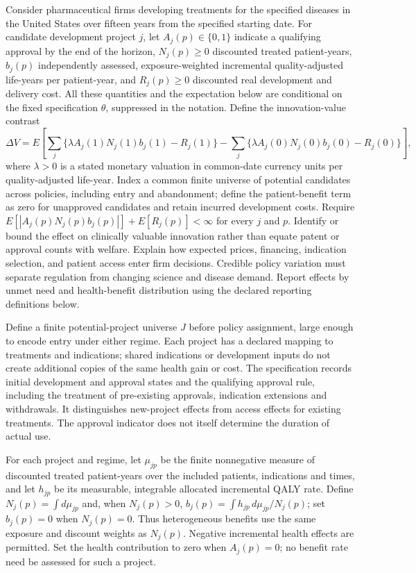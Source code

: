 \documentclass[11pt,a4paper]{article}
\begin{document}
Consider pharmaceutical firms developing treatments for the specified diseases in the United States over fifteen years from the specified starting date. For candidate development project \(j\), let \(A_j(p)\in\{0,1\}\) indicate a qualifying approval by the end of the horizon, \(N_j(p)\geq0\) discounted treated patient-years, \(b_j(p)\) independently assessed, exposure-weighted incremental quality-adjusted life-years per patient-year, and \(R_j(p)\geq0\) discounted real development and delivery cost. All these quantities and the expectation below are conditional on the fixed specification \(\theta\), suppressed in the notation. Define the innovation-value contrast
\[\Delta V=E\!\left[\sum_j\{\lambda A_j(1)N_j(1)b_j(1)-R_j(1)\}-\sum_j\{\lambda A_j(0)N_j(0)b_j(0)-R_j(0)\}\right],\]
where \(\lambda>0\) is a stated monetary valuation in common-date currency units per quality-adjusted life-year. Index a common finite universe of potential candidates across policies, including entry and abandonment; define the patient-benefit term as zero for unapproved candidates and retain incurred development costs. Require \(E[|A_j(p)N_j(p)b_j(p)|]+E[R_j(p)]<\infty\) for every \(j\) and \(p\). Identify or bound the effect on clinically valuable innovation rather than equate patent or approval counts with welfare. Explain how expected prices, financing, indication selection, and patient access enter firm decisions. Credible policy variation must separate regulation from changing science and disease demand. Report effects by unmet need and health-benefit distribution using the declared reporting definitions below.

Define a finite potential-project universe \(J\) before policy assignment, large enough to encode entry under either regime. Each project has a declared mapping to treatments and indications; shared indications or development inputs do not create additional copies of the same health gain or cost. The specification records initial development and approval states and the qualifying approval rule, including the treatment of pre-existing approvals, indication extensions and withdrawals. It distinguishes new-project effects from access effects for existing treatments. The approval indicator does not itself determine the duration of actual use.

For each project and regime, let \(\mu_{jp}\) be the finite nonnegative measure of discounted treated patient-years over the included patients, indications and times, and let \(h_{jp}\) be its measurable, integrable allocated incremental QALY rate. Define \(N_j(p)=\int d\mu_{jp}\) and, when \(N_j(p)>0\), \(b_j(p)=\int h_{jp}\,d\mu_{jp}/N_j(p)\); set \(b_j(p)=0\) when \(N_j(p)=0\). Thus heterogeneous benefits use the same exposure and discount weights as \(N_j(p)\). Negative incremental health effects are permitted. Set the health contribution to zero when \(A_j(p)=0\); no benefit rate need be assessed for such a project.
\end{document}
